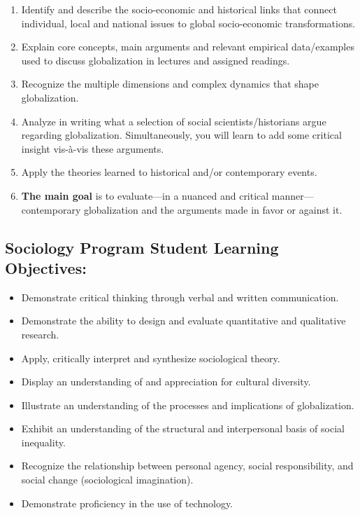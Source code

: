 \documentclass[11pt,]{article}
\providecommand{\tightlist}{%
  \setlength{\itemsep}{0pt}\setlength{\parskip}{0pt}}
\begin{document}
\begin{enumerate}
\def\labelenumi{\arabic{enumi}.}
\tightlist
\item
  Identify and describe the socio-economic and historical links that
  connect individual, local and national issues to global socio-economic
  transformations.
\item
  Explain core concepts, main arguments and relevant empirical
  data/examples used to discuss globalization in lectures and assigned
  readings.
\item
  Recognize the multiple dimensions and complex dynamics that shape
  globalization.
\item
  Analyze in writing what a selection of social scientists/historians
  argue regarding globalization. Simultaneously, you will learn to add
  some critical insight vis-à-vis these arguments.
\item
  Apply the theories learned to historical and/or contemporary events.
\item
  \textbf{The main goal} is to evaluate---in a nuanced and critical
  manner---contemporary globalization and the arguments made in favor or
  against it.
\end{enumerate}

\hypertarget{sociology-program-student-learning-objectives}{%
\subsection{Sociology Program Student Learning
Objectives:}\label{sociology-program-student-learning-objectives}}

\begin{itemize}
\tightlist
\item
  Demonstrate critical thinking through verbal and written
  communication.
\item
  Demonstrate the ability to design and evaluate quantitative and
  qualitative research.
\item
  Apply, critically interpret and synthesize sociological theory.
\item
  Display an understanding of and appreciation for cultural diversity.
\item
  Illustrate an understanding of the processes and implications of
  globalization.
\item
  Exhibit an understanding of the structural and interpersonal basis of
  social inequality.
\item
  Recognize the relationship between personal agency, social
  responsibility, and social change (sociological imagination).
\item
  Demonstrate proficiency in the use of technology.
\end{itemize}
\end{document}
